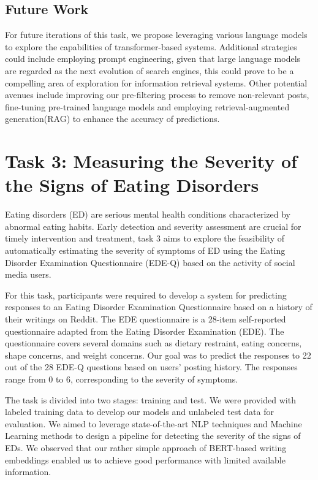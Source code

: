 \documentclass[]{style/ceurart}
\begin{document}
\subsection{Future Work}

For future iterations of this task, we propose leveraging various language models to explore the capabilities of transformer-based systems. Additional strategies could include employing prompt engineering, given that large language models are regarded as the next evolution of search engines, this could prove to be a compelling area of exploration for information retrieval systems. Other potential avenues include improving our pre-filtering process to remove non-relevant posts, fine-tuning pre-trained language models and employing retrieval-augmented generation(RAG) to enhance the accuracy of predictions.

\section{Task 3: Measuring the Severity of the Signs of Eating Disorders}

Eating disorders (ED) are serious mental health conditions characterized by abnormal eating habits. Early detection and severity assessment are crucial for timely intervention and treatment, task 3 aims to explore the feasibility of automatically estimating the severity of symptoms of ED using the Eating Disorder Examination Questionnaire (EDE-Q) based on the activity of social media users.

For this task, participants were required to develop a system for predicting responses to an Eating Disorder Examination Questionnaire based on a history of their writings on Reddit. The EDE questionnaire is a 28-item self-reported questionnaire adapted from the Eating Disorder Examination (EDE). The questionnaire covers several domains such as dietary restraint, eating concerns, shape concerns, and weight concerns. Our goal was to predict the responses to 22 out of the 28 EDE-Q questions based on users' posting history. The responses range from 0 to 6, corresponding to the severity of symptoms.

The task is divided into two stages: training and test. We were provided with labeled training data to develop our models and unlabeled test data for evaluation. We aimed to leverage state-of-the-art NLP techniques and Machine Learning methods to design a pipeline for detecting the severity of the signs of EDs. We observed that our rather simple approach of BERT-based \cite{devlin_bert_2019} writing embeddings enabled us to achieve good performance with limited available information.
\end{document}
